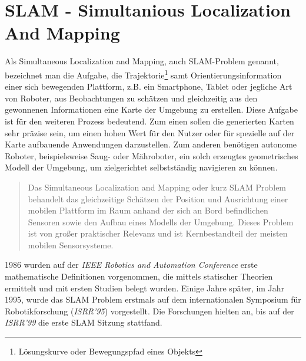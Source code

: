 \section{SLAM - Simultanious Localization And Mapping}
\label{chap:SLAM}
Als Simultaneous Localization and Mapping, auch \acs{SLAM}-Problem genannt, bezeichnet man die Aufgabe, die Trajektorie\footnote{Lösungskurve oder Bewegungspfad eines Objekts} 
samt Orientierungsinformation einer sich bewegenden Plattform, z.B. ein Smartphone, Tablet oder jegliche Art von Roboter, aus 
Beobachtungen zu schätzen und gleichzeitig aus den gewonnenen Informationen eine Karte der Umgebung zu erstellen.
Diese Aufgabe ist für den weiteren Prozess bedeutend. Zum einen sollen die generierten Karten sehr präzise sein, um einen hohen 
Wert für den Nutzer oder für spezielle auf der Karte aufbauende Anwendungen darzustellen. Zum anderen benötigen autonome Roboter, 
beispielsweise Saug- oder Mähroboter, ein solch erzeugtes geometrisches Modell der Umgebung, um zielgerichtet selbstständig navigieren zu 
können. %
\begin{quote}
    Das Simultaneous Localization and Mapping oder kurz SLAM Problem behandelt das gleichzeitige Schätzen der Position und Ausrichtung einer 
    mobilen Plattform im Raum anhand der sich an Bord befindlichen Sensoren sowie den Aufbau eines Modells der Umgebung. Dieses Problem ist 
    von großer praktischer Relevanz und ist Kernbestandteil der meisten mobilen Sensorsysteme. \cite{slamdefi.2016a}
\end{quote}
1986 wurden auf der \textit{IEEE Robotics and Automation Conference} erste mathematische Definitionen vorgenommen, die mittels statischer 
Theorien ermittelt und mit ersten Studien belegt wurden. Einige Jahre später, im Jahr 1995, wurde das \acs{SLAM} Problem erstmals auf dem 
internationalen Symposium für Robotikforschung (\textit{ISRR'95}) vorgestellt. Die Forschungen hielten an, bis auf der \textit{ISRR'99} 
die erste \acs{SLAM} Sitzung stattfand. 

